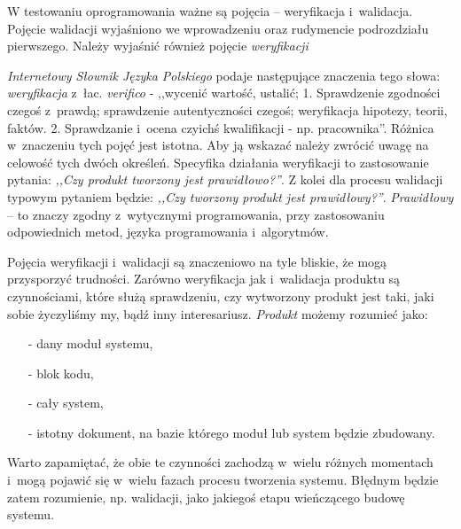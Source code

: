 \documentclass[brudnopis]{xmgr}
\begin{document}
\indent \indent \indent \textcolor{sb}{W testowaniu oprogramowania ważne są pojęcia – weryfikacja i~walidacja.} \textcolor{sa}{Pojęcie walidacji wyjaśniono we wprowadzeniu oraz rudymencie podrozdziału pierwszego.} \textcolor{sb}{Należy wyjaśnić również pojęcie \textit{weryfikacji}}

\textcolor{sa}{\textit{Internetowy Słownik Języka Polskiego} podaje następujące znaczenia tego słowa: \textit{weryfikacja} z~łac. \textit{verifico} - ,,wycenić wartość, ustalić; 1. Sprawdzenie zgodności czegoś z~prawdą; sprawdzenie autentyczności czegoś; weryfikacja hipotezy, teorii, faktów. 2. Sprawdzanie i~ocena czyichś kwalifikacji - np. pracownika''.} \textcolor{sb}{Różnica w~znaczeniu tych pojęć jest istotna.} \textcolor{sa}{Aby ją wskazać należy zwrócić uwagę na celowość tych dwóch określeń.} \textcolor{sb}{Specyfika działania weryfikacji to zastosowanie pytania:} \textcolor{sa}{\textit{,,Czy produkt tworzony jest prawidłowo?''}.} \textcolor{sb}{Z kolei dla procesu walidacji typowym pytaniem będzie:} \textcolor{sa}{\textit{,,Czy tworzony produkt jest prawidłowy?''}.} \textcolor{sb}{\textit{Prawidłowy} – to znaczy} \textcolor{sa}{zgodny z~wytycznymi programowania, przy zastosowaniu odpowiednich metod, języka programowania i~algorytmów. }

\textcolor{sb}{Pojęcia weryfikacji i~walidacji są znaczeniowo na tyle bliskie, że mogą przysporzyć trudności.} \textcolor{sa}{Zarówno weryfikacja jak i~walidacja produktu są czynnościami, które służą sprawdzeniu,} \textcolor{sb}{czy wytworzony produkt jest taki, jaki sobie życzyliśmy my, bądź inny interesariusz.} \textcolor{sa}{\textit{Produkt} możemy rozumieć jako: }

\begin{itemize}
  \item[-] \textcolor{sa}{dany moduł systemu,}
  \item[-] \textcolor{sa}{blok kodu,}
  \item[-] \textcolor{sa}{cały system,}
  \item[-] \textcolor{sa}{istotny dokument, na bazie którego moduł lub system będzie zbudowany.}
\end{itemize}

\textcolor{sb}{Warto zapamiętać, że obie te czynności zachodzą w~wielu różnych momentach i~mogą pojawić się w~wielu fazach procesu tworzenia systemu.} \textcolor{sa}{Błędnym będzie zatem rozumienie, np. walidacji, jako jakiegoś etapu wieńczącego budowę systemu.}
\end{document}
